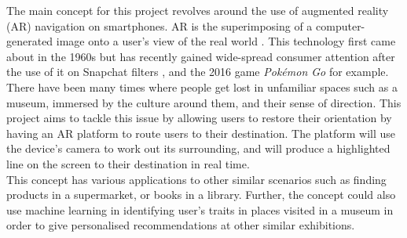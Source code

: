 
The main concept for this project revolves around the use of augmented reality (AR) navigation on smartphones. AR is the superimposing of a computer-generated image onto a user's view of the real world \cite{oxforddict}. This technology first came about in the 1960s \cite{InteractionDesign} but has recently gained wide-spread consumer attention after the use of it on Snapchat filters \cite{Snapchat}, and the 2016 game \textit{Pokémon Go} for example. There have been many times where people get lost in unfamiliar spaces such as a museum, immersed by the culture around them, and their sense of direction. This project aims to tackle this issue by allowing users to restore their orientation by having an AR platform to route users to their destination. The platform will use the device's camera to work out its surrounding, and will produce a highlighted line on the screen to their destination in real time.\\

This concept has various applications to other similar scenarios such as finding products in a supermarket, or books in a library. Further, the concept could also use machine learning in identifying user's traits in places visited in a museum in order to give personalised recommendations at other similar exhibitions.